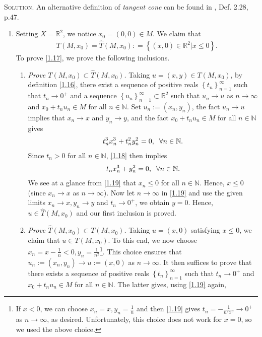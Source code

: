 \documentclass[a4paper]{article}
\numberwithin{equation}{section}
\begin{document}
\textsc{Solution.} An alternative definition of \textit{tangent cone} can be found in \cite{1}, Def. 2.28, p.47.
\begin{enumerate}
\item Setting $X=\mathbb{R}^2$, we notice $x_0 =\left(0,0\right) \in M$. We claim that 
\begin{align}
\label{1.17}
T\left( {M,{x_0}} \right) = \widehat T\left( {M,{x_0}} \right): = \left\{ {\left( {x,0} \right) \in {\mathbb{R} ^2}|x \le 0} \right\}.
\end{align}
To prove \eqref{1.17}, we prove the following inclusions. 
\begin{enumerate}
\item \textit{Prove $T\left( {M,{x_0}} \right) \subset \widehat T\left( {M,{x_0}} \right)$.} Taking $u = \left( {x,y} \right) \in T\left( {M,{x_0}} \right)$, by definition \eqref{1.16}, there exist a sequence of positive reals $\left\{ {{t_n}} \right\}_{n = 1}^\infty$ such that  $t_n\to 0^+$ and a sequence $\left\{ {{u_n}} \right\}_{n = 1}^\infty  \subset {\mathbb{R}^2}$ such that $u_n\to u$ as $n\to \infty$ and ${x_0} + t_n{u_n} \in M$ for all $n\in \mathbb{N}$. Set $u_n:=\left(x_n,y_n\right)$, the fact $u_n\to u$ implies that $x_n\to x$ and $y_n\to y$, and the fact $x_0 + t_nu_n \in M$ for all $n\in \mathbb{N}$ gives
\begin{align}
\label{1.18}
t_n^3x_n^3 + t_n^2y_n^2 = 0, \hspace{0.2cm}\forall n \in \mathbb{N}.
\end{align}
Since $t_n >0$ for all $n\in \mathbb{N}$, \eqref{1.18} then implies
\begin{align}
\label{1.19}
{t_n}x_n^3 + y_n^2 = 0, \hspace{0.2cm}\forall n \in \mathbb{N}.
\end{align}
We see at a glance from \eqref{1.19} that $x_n \le 0$ for all $n\in \mathbb{N}$. Hence, $x\le 0$ (since $x_n \to x$ as $n\to \infty$). Now let $n\to \infty$ in \eqref{1.19} and use the given limits $x_n\to x, y_n\to y$ and $t_n\to 0^+$, we obtain $y=0$. Hence, $u \in \widehat T\left(M,x_0\right)$ and our first inclusion is proved.
\item \textit{Prove $\widehat T\left( {M,{x_0}} \right) \subset T\left( {M,{x_0}} \right)$.} Taking $u = \left( {x,0} \right)$ satisfying $x\le 0$, we claim that $u \in T\left(M,{x_0}\right)$. To this end, we now choose ${x_n} = x - \frac{1}{n} < 0,{y_n} = \frac{1}{{{n^2}}}$\footnote{If $x<0$, we can choose $x_n=x,y_n=\frac{1}{n}$ and then \eqref{1.19} gives $t_n=-\frac{1}{n^2x^3} \to 0^+$ as $n\to \infty$, as desired. Unfortunately, this choice does not work for $x=0$, so we used the above choice.}. This choice ensures that $u_n:=\left(x_n,y_n\right)\to u:=\left(x,0\right)$ as $n\to \infty$. It then suffices to prove that there exists a sequence of positive reals $\left\{ {{t_n}} \right\}_{n = 1}^\infty $ such that $t_n \to 0^+$ and $x_0+t_nu_n\in M$ for all $n\in \mathbb{N}$. The latter gives, using \eqref{1.19} again, 

\end{enumerate}
\end{enumerate}
\end{document}
